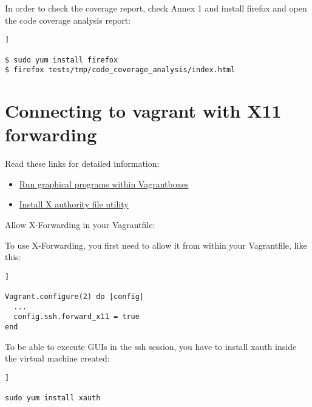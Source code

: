 In order to check the coverage report, check Annex 1 and install firefox and open the code coverage analysis report:

\begin{lstlisting}[breaklines=true, style=c]]

$ sudo yum install firefox
$ firefox tests/tmp/code_coverage_analysis/index.html

\end{lstlisting}

\section {Connecting to vagrant with X11 forwarding}

Read these links for detailed information:

\begin{itemize}

\item \href{https://coderwall.com/p/ozhfva/run-graphical-programs-within-vagrantboxes}{Run graphical programs within Vagrantboxes} \\

\end{itemize}
\begin{itemize}

\item \href{https://www.cyberciti.biz/faq/how-to-fix-x11-forwarding-request-failed-on-channel-0/}{Install X authority file utility} \\

\end{itemize}

Allow X-Forwarding in your Vagrantfile:

To use X-Forwarding, you first need to allow it from within your Vagrantfile, like this:

\begin{lstlisting}[breaklines=true, style=c]]

Vagrant.configure(2) do |config|
  ...
  config.ssh.forward_x11 = true
end

\end{lstlisting}

To be able to execute GUIs in the ssh session, you have to install xauth inside the virtual machine created:

\begin{lstlisting}[breaklines=true, style=c]]

sudo yum install xauth

\end{lstlisting}

